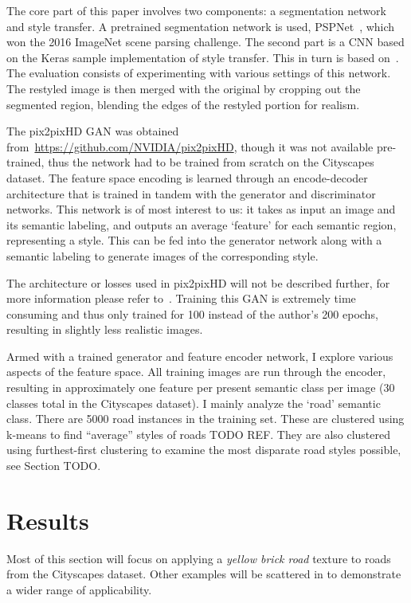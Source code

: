 \documentclass[10pt,twocolumn,letterpaper]{article}
\begin{document}
The core part of this paper involves two components: a segmentation network and style transfer. A pretrained segmentation network is used, PSPNet~\cite{zhao2017pyramid}, which won the 2016 ImageNet scene parsing challenge. The second part is a CNN based on the Keras sample implementation of style transfer. This in turn is based on~\cite{gatys2016image}. The evaluation consists of experimenting with various settings of this network. The restyled image is then merged with the original by cropping out the segmented region, blending the edges of the restyled portion for realism.

The pix2pixHD GAN was obtained from~\url{https://github.com/NVIDIA/pix2pixHD}, though it was not available pre-trained, thus the network had to be trained from scratch on the Cityscapes~\cite{cordts2016cityscapes} dataset. The feature space encoding is learned through an encode-decoder architecture that is trained in tandem with the generator and discriminator networks. This network is of most interest to us: it takes as input an image and its semantic labeling, and outputs an average `feature' for each semantic region, representing a style. This can be fed into the generator network along with a semantic labeling to generate images of the corresponding style.

The architecture or losses used in pix2pixHD will not be described further, for more information please refer to~\cite{isola2017image}. Training this GAN is extremely time consuming and thus only trained for 100 instead of the author's 200 epochs, resulting in slightly less realistic images.

Armed with a trained generator and feature encoder network, I explore various aspects of the feature space. All training images are run through the encoder, resulting in approximately one feature per present semantic class per image (30 classes total in the Cityscapes dataset). I mainly analyze the `road' semantic class. There are 5000 road instances in the training set. These are clustered using k-means to find ``average'' styles of roads TODO REF. They are also clustered using furthest-first clustering to examine the most disparate road styles possible, see Section TODO.


\section{Results}

Most of this section will focus on applying a \textit{yellow brick road} texture to roads from the Cityscapes dataset. Other examples will be scattered in to demonstrate a wider range of applicability. 
\end{document}
